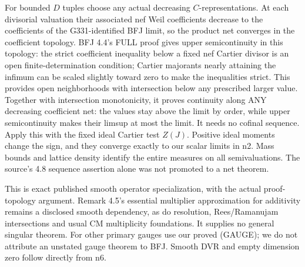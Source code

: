 For bounded \(D\) tuples choose any actual decreasing \(C\)-representations. At each divisorial valuation their associated nef Weil coefficients decrease to the coefficients of the G331-identified BFJ limit, so the product net converges in the coefficient topology. BFJ 4.4's FULL proof gives upper semicontinuity in this topology: the strict coefficient inequality below a fixed nef Cartier divisor is an open finite-determination condition; Cartier majorants nearly attaining the infimum can be scaled slightly toward zero to make the inequalities strict. This provides open neighborhoods with intersection below any prescribed larger value. Together with intersection monotonicity, it proves continuity along ANY decreasing coefficient net: the values stay above the limit by order, while upper semicontinuity makes their limsup at most the limit. It needs no cofinal sequence. Apply this with the fixed ideal Cartier test \(Z(J)\). Positive ideal moments change the sign, and they converge exactly to our scalar limits in n2. Mass bounds and lattice density identify the entire measures on all semivaluations. The source's 4.8 sequence assertion alone was not promoted to a net theorem.

This is exact published smooth operator specialization, with the actual proof-topology argument. Remark 4.5's essential multiplier approximation for additivity remains a disclosed smooth dependency, as do resolution, Rees/Ramanujam intersections and usual CM multiplicity foundations. It supplies no general singular theorem. For other primary gauges use our proved (GAUGE); we do not attribute an unstated gauge theorem to BFJ. Smooth DVR and empty dimension zero follow directly from n6.
